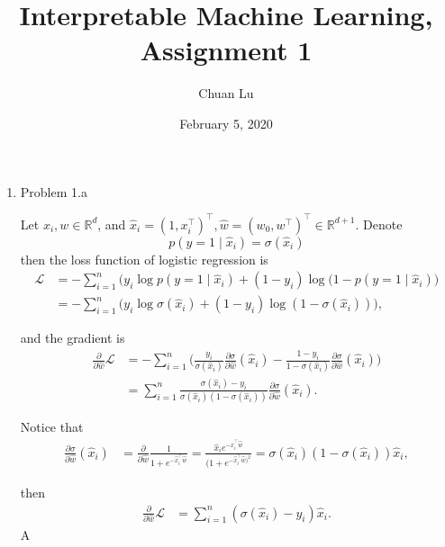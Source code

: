 \documentclass{article}%
\begin{document}
\title{Interpretable Machine Learning, Assignment 1}
\author{Chuan Lu}
\date{February 5, 2020}
\maketitle

\newcommand{\hxi}{\hat{x}_i}
\newcommand{\hw}{\hat{w}}

\begin{enumerate}

\item Problem 1.a

Let $x_i, w\in\mathbb{R}^d $, and $\hxi = (1, x_i^\top)^\top ,\hw = (w_0, w^\top)^\top \in\mathbb{R}^{d+1} $. Denote
\begin{equation}
p(y = 1\mid \hxi) = \sigma(\hxi)
\end{equation}
then the loss function of logistic regression is
\begin{equation}
\begin{aligned}
\mathcal{L} &= -\sum_{i=1}^{n}\Big ( y_i \log p(y = 1 \mid \hxi) + (1-y_i)\log (1- p(y = 1 \mid \hxi)\Big ) \\
&= -\sum_{i=1}^{n} \Big( y_i \log\sigma(\hxi) + (1-y_i)\log(1-\sigma(\hxi))\Big),
\end{aligned}
\end{equation}

and the gradient is
\begin{equation}
\begin{aligned}
\frac{\partial}{\partial \hw}\mathcal{L} &= -\sum_{i=1}^{n} \Big( \frac{y_i}{\sigma(\hxi)}\frac{\partial \sigma}{\partial \hw}(\hxi) - \frac{1-y_i}{1-\sigma(\hxi)}\frac{\partial \sigma}{\partial \hw}(\hxi)\Big) \\
&= \sum_{i=1}^{n}\frac{\sigma(\hxi)-y_i}{\sigma(\hxi)(1-\sigma(\hxi))}\frac{\partial \sigma}{\partial \hw}(\hxi).
\end{aligned}
\end{equation}

Notice that
\begin{equation}
\begin{aligned}
\frac{\partial \sigma}{\partial \hw}(\hxi) &= \frac{\partial}{\partial \hw}\frac{1}{1+e^{-\hxi^\top \hw}} = \frac{\hxi e^{-\hxi^\top \hw}}{(1+e^{-\hxi^\top \hw)^2}} = \sigma(\hxi)(1-\sigma(\hxi))\hxi,
\end{aligned}
\end{equation}

then
\begin{equation}
\begin{aligned}
\frac{\partial}{\partial \hw}\mathcal{L} &= \sum_{i=1}^{n}(\sigma(\hxi)-y_i)\hxi.
\end{aligned}
\end{equation}A


\end{enumerate}
\end{document}
